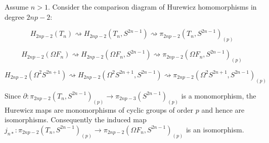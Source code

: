 Assume $n > 1$. Consider the comparison diagram of Hurewicz homomorphisms in degree $2np-2$:

$$H_{2np-2}(T_n) \rightsquigarrow H_{2np-2}(T_n, S^{2n-1}) \rightsquigarrow \pi_{2np-2}(T_n, S^{2n-1})_{(p)}$$

$$H_{2np-2}(\Omega F_n) \rightsquigarrow H_{2np-2}(\Omega F_n, S^{2n-1}) \rightsquigarrow \pi_{2np-2}(\Omega F_n, S^{2n-1})_{(p)}$$

$$H_{2np-2}(\Omega^2 S^{2n+1}) \rightsquigarrow H_{2np-2}(\Omega^2 S^{2n+1}, S^{2n-1}) \rightsquigarrow \pi_{2np-2}(\Omega^2 S^{2n+1}, S^{2n-1})_{(p)}$$

Since $\partial \colon \pi_{2np-2}(T_n, S^{2n-1})_{(p)} \to \pi_{2np-3}(S^{2n-1})_{(p)}$ is a monomorphism, the Hurewicz maps are monomorphisms of cyclic groups of order $p$ and hence are isomorphisms. Consequently the induced map $j_{n*} \colon \pi_{2np-2}(T_n, S^{2n-1})_{(p)} \to \pi_{2np-2}(\Omega F_n, S^{2n-1})_{(p)}$ is an isomorphism.
